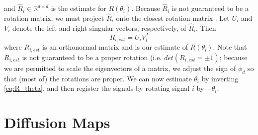 \documentclass{pnastwo}
\begin{document}
\begin{article}
\begin{materials}
and $\hat{R}_i \in \mathbb{R}^{d \times d}$ is the estimate for $R(\theta_i)$. 
%
Because $\hat{R}_i$ is not guaranteed to be a rotation matrix, we must project $\hat{R}_i$ onto the closest rotation matrix \cite{...}. 
%
Let $U_i$ and $V_i$ denote the left and right singular vectors, respectively, of $\hat{R}_i$.
%
Then
\begin{equation} \label{eq:R_est}
R_{i, est} = U_i V_i^T
\end{equation} 
where $R_{i, est}$ is an orthonormal matrix and is our estimate of $R(\theta_i)$. 
%
Note that $R_{i, est}$ is not guaranteed to be a proper rotation (i.e. $det(R_{i, est} = \pm 1)$; because we are permitted to scale the eigenvectors of a matrix, we adjust the sign of $\phi_d$ so that (most of) the rotations are proper. 
%
We can now estimate $\theta_{i}$ by inverting \eqref{eq:R_theta}, and then register the signals by rotating signal $i$ by $-\theta_i$. 


\section{Diffusion Maps}


\end{materials}
\end{article}
\end{document}
